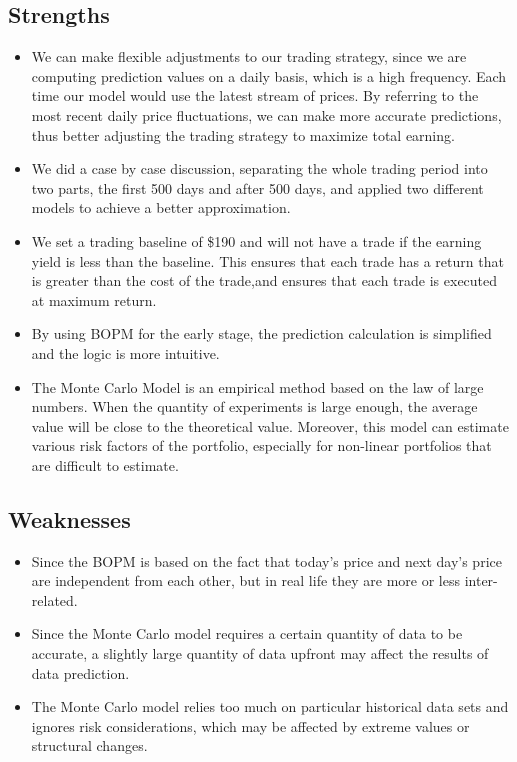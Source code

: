 \documentclass[12pt]{article}
\begin{document}
\subsection{Strengths}
\begin{itemize}
    \item We can make flexible adjustments to our trading strategy, since we are computing prediction values on a daily basis, which is a high frequency. Each time our model would use the latest stream of prices. By referring to the most recent daily price fluctuations, we can make more accurate predictions, thus better adjusting the trading strategy to maximize total earning.
    \item We did a case by case discussion, separating the whole trading period into two parts, the first 500 days and after 500 days, and applied two different models to achieve a better approximation.
    \item We set a trading baseline of \$190 and will not have a trade if the earning yield is less than the baseline. This ensures that each trade has a return that is greater than the cost of the trade,and ensures that each trade is executed at maximum return.
    \item By using BOPM for the early stage, the prediction calculation is simplified and the logic is more intuitive.
    \item The Monte Carlo Model is an empirical method based on the law of large numbers. When the quantity of experiments is large enough, the average value will be close to the theoretical value. Moreover, this model can estimate various risk factors of the portfolio, especially for non-linear portfolios that are difficult to estimate.
\end{itemize}
\subsection{Weaknesses}
\begin{itemize}
    \item Since the BOPM is based on the fact that today's price and next day's price are independent from each other, but in real life they are more or less inter-related.
    \item Since the Monte Carlo model requires a certain quantity of data to be accurate, a slightly large quantity of data upfront may affect the results of data prediction.
    \item The Monte Carlo model relies too much on particular historical data sets and ignores risk considerations, which may be affected by extreme values or structural changes.
\end{itemize}
\newpage
\end{document}
